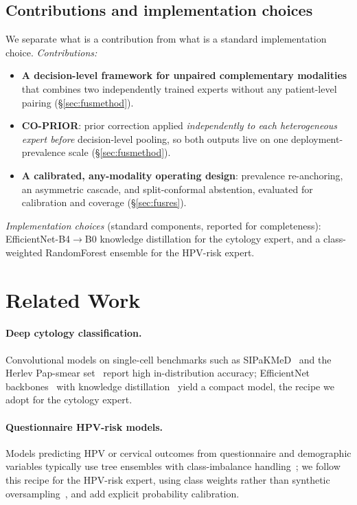 \documentclass[sigplan,nonacm,screen]{acmart}
\begin{document}
\subsection{Contributions and implementation choices}
We separate what is a contribution from what is a standard implementation choice.
\emph{Contributions:}
\begin{itemize}
  \item \textbf{A decision-level framework for unpaired complementary modalities} that combines two
    independently trained experts without any patient-level pairing (\S\ref{sec:fusmethod}).
  \item \textbf{CO-PRIOR}: prior correction applied \emph{independently to each heterogeneous expert before}
    decision-level pooling, so both outputs live on one deployment-prevalence scale (\S\ref{sec:fusmethod}).
  \item \textbf{A calibrated, any-modality operating design}: prevalence re-anchoring, an asymmetric cascade,
    and split-conformal abstention, evaluated for calibration and coverage (\S\ref{sec:fusres}).
\end{itemize}
\emph{Implementation choices} (standard components, reported for completeness): EfficientNet-B4$\to$B0
knowledge distillation for the cytology expert, and a class-weighted RandomForest ensemble for the
HPV-risk expert.

\section{Related Work}
\paragraph{Deep cytology classification.} Convolutional models on single-cell benchmarks such as
SIPaKMeD~\cite{plissiti2018} and the Herlev Pap-smear set~\cite{jantzen2005} report high in-distribution
accuracy; EfficientNet backbones~\cite{tan2019efficientnet} with knowledge distillation~\cite{hinton2015}
yield a compact model, the recipe we adopt for the cytology expert.

\paragraph{Questionnaire HPV-risk models.} Models predicting HPV or cervical outcomes from questionnaire and
demographic variables typically use tree ensembles with class-imbalance handling~\cite{hu2024nhanes}; we
follow this recipe for the HPV-risk expert, using class weights rather than synthetic
oversampling~\cite{chawla2002}, and add explicit probability calibration.
\end{document}
